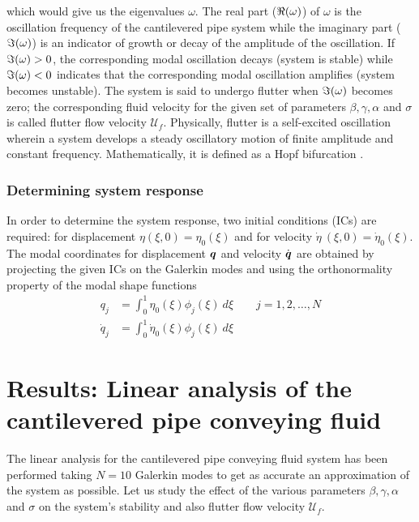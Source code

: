 \documentclass[12pt]{report}
\begin{document}
which would give us the eigenvalues $\omega$. The real part ($\real (\omega)$) of $\omega$ is the oscillation frequency of the cantilevered pipe system while the imaginary part ($\imaginary (\omega)$) is an indicator of growth or decay of the amplitude of the oscillation. If $\imaginary (\omega) > 0$, the corresponding modal oscillation decays (system is stable) while $\imaginary (\omega) < 0$ indicates that the corresponding modal oscillation amplifies (system becomes unstable). The system is said to undergo flutter when $\imaginary (\omega)$ becomes zero; the corresponding fluid velocity for the given set of parameters $\beta, \gamma, \alpha$ and $\sigma$ is called flutter flow velocity $\mathcal{U}_f$. Physically, flutter is a self-excited oscillation wherein a system develops a steady oscillatory motion of finite amplitude and constant frequency. Mathematically, it is defined as a Hopf bifurcation \cite{paidoussis}.

\subsection{Determining system response}
In order to determine the system response, two initial conditions (ICs) are required: for displacement $\eta (\xi, 0) = \eta_0 (\xi)$ and for velocity $\dot{\eta}~(\xi, 0) = \dot{\eta}_0 (\xi)$. The modal coordinates for displacement $\vb*{q}$ and velocity $\dot{\vb*{q}}$ are obtained by projecting the given ICs on the Galerkin modes and using the orthonormality property of the modal shape functions \cite{meirovitch}
\begin{align*}
   q_j &=  \int_0^1 \eta_0 (\xi) \phi_j (\xi)~d\xi \qquad j = 1, 2, \dots, N  \\
  \dot{q}_j &= \int_0^1 \dot{\eta}_0 (\xi) \phi_j (\xi)~d\xi
\end{align*}





\chapter{Results: Linear analysis of the cantilevered pipe conveying fluid} \label{chap:4}

The linear analysis for the cantilevered pipe conveying fluid system has been performed taking $N = 10$ Galerkin modes to get as accurate an approximation of the system as possible. Let us study the effect of the various parameters $\beta, \gamma, \alpha$ and $\sigma$ on the system's stability and also flutter flow velocity $\mathcal{U}_f$.
\end{document}
